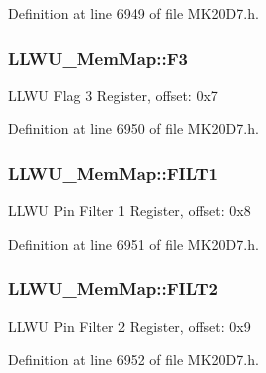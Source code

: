 Definition at line 6949 of file M\+K20\+D7.\+h.

\subsubsection[{\texorpdfstring{F3}{F3}}]{ L\+L\+W\+U\+\_\+\+Mem\+Map\+::\+F3}\hypertarget{struct_l_l_w_u___mem_map_a47d12785dc2fc2afa376e2398c7619f1}{}\label{struct_l_l_w_u___mem_map_a47d12785dc2fc2afa376e2398c7619f1}
L\+L\+WU Flag 3 Register, offset\+: 0x7 

Definition at line 6950 of file M\+K20\+D7.\+h.

\subsubsection[{\texorpdfstring{F\+I\+L\+T1}{FILT1}}]{ L\+L\+W\+U\+\_\+\+Mem\+Map\+::\+F\+I\+L\+T1}\hypertarget{struct_l_l_w_u___mem_map_a80ad19326e9bf7209c71d7955e4ef044}{}\label{struct_l_l_w_u___mem_map_a80ad19326e9bf7209c71d7955e4ef044}
L\+L\+WU Pin Filter 1 Register, offset\+: 0x8 

Definition at line 6951 of file M\+K20\+D7.\+h.

\subsubsection[{\texorpdfstring{F\+I\+L\+T2}{FILT2}}]{ L\+L\+W\+U\+\_\+\+Mem\+Map\+::\+F\+I\+L\+T2}\hypertarget{struct_l_l_w_u___mem_map_a84fdf2d8e40d91c4ad620512aaca152b}{}\label{struct_l_l_w_u___mem_map_a84fdf2d8e40d91c4ad620512aaca152b}
L\+L\+WU Pin Filter 2 Register, offset\+: 0x9 

Definition at line 6952 of file M\+K20\+D7.\+h.

